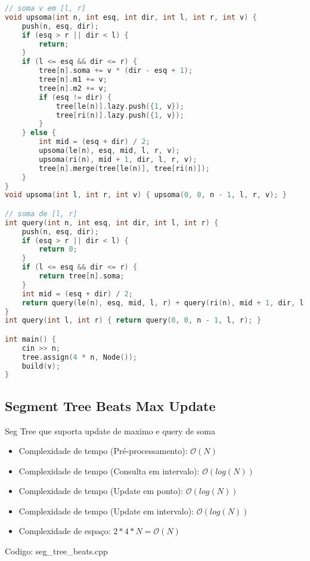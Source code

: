\documentclass[10pt, a4paper, oneside]{book}
\begin{document}
\begin{lstlisting}[language=C++]
// soma v em [l, r]
void upsoma(int n, int esq, int dir, int l, int r, int v) {
    push(n, esq, dir);
    if (esq > r || dir < l) {
        return;
    }
    if (l <= esq && dir <= r) {
        tree[n].soma += v * (dir - esq + 1);
        tree[n].m1 += v;
        tree[n].m2 += v;
        if (esq != dir) {
            tree[le(n)].lazy.push({1, v});
            tree[ri(n)].lazy.push({1, v});
        }
    } else {
        int mid = (esq + dir) / 2;
        upsoma(le(n), esq, mid, l, r, v);
        upsoma(ri(n), mid + 1, dir, l, r, v);
        tree[n].merge(tree[le(n)], tree[ri(n)]);
    }
}
void upsoma(int l, int r, int v) { upsoma(0, 0, n - 1, l, r, v); }

// soma de [l, r]
int query(int n, int esq, int dir, int l, int r) {
    push(n, esq, dir);
    if (esq > r || dir < l) {
        return 0;
    }
    if (l <= esq && dir <= r) {
        return tree[n].soma;
    }
    int mid = (esq + dir) / 2;
    return query(le(n), esq, mid, l, r) + query(ri(n), mid + 1, dir, l, r);
}
int query(int l, int r) { return query(0, 0, n - 1, l, r); }

int main() {
    cin >> n;
    tree.assign(4 * n, Node());
    build(v);
}
\end{lstlisting}
\hfill

\subsection{Segment Tree Beats Max Update}
Seg Tree que suporta update de maximo e query de soma



\begin{itemize}
\item Complexidade de tempo (Pré-processamento): $\mathcal{O}(N)$
\item Complexidade de tempo (Consulta em intervalo): $\mathcal{O}(log(N))$
\item Complexidade de tempo (Update em ponto): $\mathcal{O}(log(N))$
\item Complexidade de tempo (Update em intervalo): $\mathcal{O}(log(N))$
\item Complexidade de espaço: $2 * 4 * N = \mathcal{O}(N)$
\end{itemize}

\hfill

Codigo: seg\_tree\_beats.cpp
\end{document}
